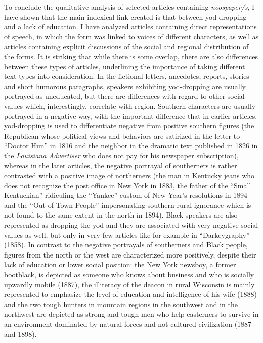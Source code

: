 To conclude the qualitative analysis of selected articles containing \emph{noospaper/s}, I have shown that the main indexical link created is that between yod-dropping and a lack of education. I have analyzed articles containing direct representations of speech, in which the form was linked to voices of different characters, as well as articles containing explicit discussions of the social and regional distribution of the forms. It is striking that while there is some overlap, there are also differences between these types of articles, underlining the importance of taking different text types into consideration. In the fictional letters, anecdotes, reports, stories and short humorous paragraphs, speakers exhibiting yod-dropping are usually portrayed as uneducated, but there are differences with regard to other social values which, interestingly, correlate with region. Southern characters are usually portrayed in a negative way, with the important difference that in earlier articles, yod-dropping is used to differentiate negative from positive southern figures (the Republican whose political views and behaviors are satirized in the letter to “Doctor Hun” in 1816 and the neighbor in the dramatic text published in 1826 in the \emph{Louisiana Advertiser} who does not pay for his newspaper subscription), whereas in the later articles, the negative portrayal of southerners is rather contrasted with a positive image of northerners (the man in Kentucky jeans who does not recognize the post office in New York in 1883, the father of the “Small Kentuckian” ridiculing the “Yankee” custom of New Year’s resolutions in 1894 and the “Out-of-Town People” impersonating southern rural ignorance which is not found to the same extent in the north in 1894). Black speakers are also represented as dropping the yod and they are associated with very negative social values as well, but only in very few articles like for example in “Darkeygraphy” (1858). In contrast to the negative portrayals of southerners and Black people, figures from the north or the west are characterized more positively, despite their lack of education or lower social position: the New York newsboy, a former bootblack, is depicted as someone who knows about business and who is socially upwardly mobile (1887), the illiteracy of the deacon in rural Wisconsin is mainly represented to emphasize the level of education and intelligence of his wife (1888) and the two tough hunters in mountain regions in the southwest and in the northwest are depicted as strong and tough men who help easterners to survive in an environment dominated by natural forces and not cultured civilization (1887 and 1898).


